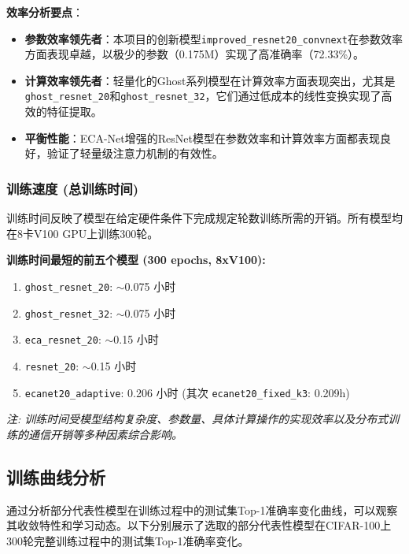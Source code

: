 \documentclass[a4paper]{article}
\begin{document}
\textbf{效率分析要点}：
\begin{itemize}
    \item \textbf{参数效率领先者}：本项目的创新模型\texttt{improved\_resnet20\_convnext}在参数效率方面表现卓越，以极少的参数（0.175M）实现了高准确率（72.33\%）。
    \item \textbf{计算效率领先者}：轻量化的Ghost系列模型在计算效率方面表现突出，尤其是\texttt{ghost\_resnet\_20}和\texttt{ghost\_resnet\_32}，它们通过低成本的线性变换实现了高效的特征提取。
    \item \textbf{平衡性能}：ECA-Net增强的ResNet模型在参数效率和计算效率方面都表现良好，验证了轻量级注意力机制的有效性。
\end{itemize}

\subsubsection{训练速度 (总训练时间)}
训练时间反映了模型在给定硬件条件下完成规定轮数训练所需的开销。所有模型均在8卡V100 GPU上训练300轮。

\textbf{训练时间最短的前五个模型 (300 epochs, 8xV100):}
\begin{enumerate}
    \item \texttt{ghost\_resnet\_20}: $\sim$0.075 小时
    \item \texttt{ghost\_resnet\_32}: $\sim$0.075 小时
    \item \texttt{eca\_resnet\_20}: $\sim$0.15 小时
    \item \texttt{resnet\_20}: $\sim$0.15 小时
    \item \texttt{ecanet20\_adaptive}: 0.206 小时 (其次 \texttt{ecanet20\_fixed\_k3}: 0.209h)
\end{enumerate}
\textit{注: 训练时间受模型结构复杂度、参数量、具体计算操作的实现效率以及分布式训练的通信开销等多种因素综合影响。}

\subsection{训练曲线分析}
通过分析部分代表性模型在训练过程中的测试集Top-1准确率变化曲线，可以观察其收敛特性和学习动态。以下分别展示了选取的部分代表性模型在CIFAR-100上300轮完整训练过程中的测试集Top-1准确率变化。
\end{document}
